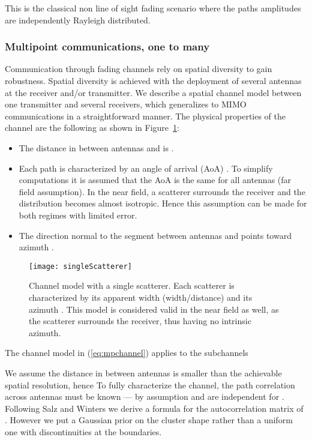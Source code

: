 \documentclass[journal,10pt]{IEEEtran}
\begin{document}
	 This is the classical non line of sight fading scenario where the paths amplitudes  are independently Rayleigh distributed.
	 \subsubsection{Multipoint communications, one to many}\label{sec:spmod}
	Communication through fading channels rely on spatial diversity to gain robustness. Spatial diversity is achieved with the deployment of several antennas at the receiver and/or transmitter. We describe a spatial channel model between one transmitter and several receivers, which generalizes to MIMO communications in a straightforward manner. The physical properties of the channel are the following as shown in Figure~\ref{fig:mpchannel}:
	\begin{itemize}
	\item The distance in between antennas  and  is .
	\item Each path is characterized by an angle of arrival (AoA) . To simplify computations it is assumed that the AoA is the same for all antennas (far field assumption). In the near field, a scatterer surrounds the receiver and the distribution becomes almost isotropic. Hence this assumption can be made for both regimes with limited error.
	\item The direction normal to the segment between antennas  and  points toward azimuth .
	\end{itemize}
	\begin{figure}[h]
\centering 
\texttt{[image: singleScatterer]}
\caption{Channel model with a single scatterer. Each scatterer is characterized by its apparent width (width/distance)  and its azimuth . This model is considered valid in the near field as well, as the scatterer surrounds the receiver, thus having no intrinsic azimuth.}
\label{fig:mpchannel}
\end{figure}
	The channel model in (\ref{eq:mpchannel}) applies to the  subchannels
	
	We assume the distance in between antennas is smaller than the achievable spatial resolution, hence 
	To fully characterize the channel, the path correlation across antennas must be known --- by assumption  and  are independent for .
	Following Salz and Winters \cite{Salz1994} we derive a formula for the autocorrelation matrix of . However we put a Gaussian prior on the cluster shape rather than a uniform one with discontinuities at the boundaries. 
\end{document}

